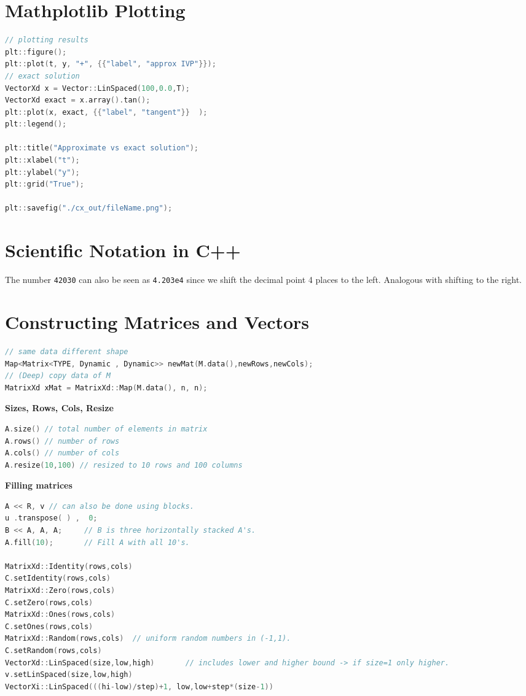\documentclass{sciposter}
\newcommand{\psection}[1]{\par \textbf{\large#1}}
\begin{document}
\begin{multicols}{2}
\section*{Mathplotlib Plotting}

\begin{lstlisting}[language=c++]
// plotting results
plt::figure();
plt::plot(t, y, "+", {{"label", "approx IVP"}});
// exact solution 
VectorXd x = Vector::LinSpaced(100,0.0,T);
VectorXd exact = x.array().tan();
plt::plot(x, exact, {{"label", "tangent"}}  );
plt::legend();

plt::title("Approximate vs exact solution");
plt::xlabel("t");
plt::ylabel("y");
plt::grid("True");

plt::savefig("./cx_out/fileName.png");
\end{lstlisting}


\section*{Scientific Notation in C++}

The number \texttt{42030} can also be seen as \texttt{4.203e4} since we shift the decimal point 4 places to the left. Analogous with shifting to the right.
	
\section*{Constructing Matrices and Vectors}
\begin{lstlisting}[language=C++]
// same data different shape
Map<Matrix<TYPE, Dynamic , Dynamic>> newMat(M.data(),newRows,newCols);
// (Deep) copy data of M
MatrixXd xMat = MatrixXd::Map(M.data(), n, n);
\end{lstlisting}


\psection{Sizes, Rows, Cols, Resize}
\begin{lstlisting}[language=C++]
A.size() // total number of elements in matrix
A.rows() // number of rows
A.cols() // number of cols
A.resize(10,100) // resized to 10 rows and 100 columns
\end{lstlisting}


\psection{Filling matrices}
\begin{lstlisting}[language=C++]
A << R,	v // can also be done using blocks. 
u .transpose( ) ,  0;
B << A, A, A;     // B is three horizontally stacked A's.
A.fill(10);       // Fill A with all 10's.

MatrixXd::Identity(rows,cols)          
C.setIdentity(rows,cols)                 
MatrixXd::Zero(rows,cols)                
C.setZero(rows,cols)                      
MatrixXd::Ones(rows,cols)          
C.setOnes(rows,cols)                 
MatrixXd::Random(rows,cols)  // uniform random numbers in (-1,1).
C.setRandom(rows,cols)                 
VectorXd::LinSpaced(size,low,high)       // includes lower and higher bound -> if size=1 only higher. 
v.setLinSpaced(size,low,high)         
VectorXi::LinSpaced(((hi-low)/step)+1, low,low+step*(size-1))
\end{lstlisting}




\end{multicols}
\end{document}
